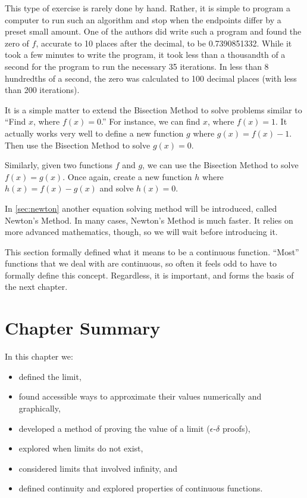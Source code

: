 {This type of exercise is rarely done by hand. Rather, it is simple to program a computer to run such an algorithm and stop when the endpoints differ by a preset small amount. One of the authors did write such a program and found the zero of $f$, accurate to 10 places after the decimal, to be 0.7390851332. While it took a few minutes to write the program, it took less than a thousandth of a second for the program to run the necessary 35 iterations. In less than 8 hundredths of a second, the zero was calculated to 100 decimal places (with less than 200 iterations).}

It is a simple matter to extend the Bisection Method to solve problems similar to ``Find $x$, where $f(x) = 0$.'' For instance, we can find $x$, where $f(x) = 1$. %
It actually works very well to define a new function $g$ where $g(x) = f(x) - 1$. Then use the Bisection Method to solve $g(x)=0$.  

Similarly, given two functions $f$ and $g$, we can use the Bisection Method to solve $f(x) = g(x)$. Once again, create a new function $h$ where $h(x) = f(x)-g(x)$ and solve $h(x) = 0$. 

In \autoref{sec:newton} another equation solving method will be introduced, called Newton's Method. In many cases, Newton's Method is much faster. It relies on more advanced mathematics, though, so we will wait before introducing it. 

This section formally defined what it means to be a continuous function. ``Most'' functions that we deal with are continuous, so often it feels odd to have to formally define this concept. Regardless, it is important, and forms the basis of the next chapter.

\section*{Chapter Summary}

In this chapter we:
\begin{itemize}
\item defined the limit, 
\item found accessible ways to approximate their values numerically and graphically, 
\item	developed a method of proving the value of a limit ($\epsilon$-$\delta$ proofs),
\item	explored when limits do not exist,
\item	considered limits that involved infinity, and
\item	defined continuity and explored properties of continuous functions.
\end{itemize}

